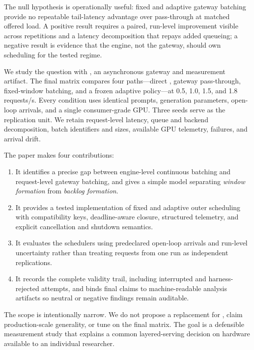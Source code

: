 The null hypothesis is operationally useful: fixed and adaptive gateway
batching provide no repeatable tail-latency advantage over pass-through at
matched offered load. A positive result requires a paired, run-level
improvement visible across repetitions and a latency decomposition that repays
added queueing; a negative result is evidence that the engine, not the gateway,
should own scheduling for the tested regime.

We study the question with \adip{}, an asynchronous gateway and measurement
artifact. The final matrix compares four paths---direct \vllm{}, gateway
pass-through, fixed-window batching, and a frozen adaptive policy---at
0.5, 1.0, 1.5, and 1.8 requests/s. Every condition uses identical prompts,
generation parameters, open-loop arrivals, and a single consumer-grade GPU.
Three seeds serve as the replication unit. We retain request-level latency,
queue and backend decomposition, batch identifiers and sizes, available GPU
telemetry, failures, and arrival drift.

The paper makes four contributions:

\begin{enumerate}[leftmargin=1.4em]
  \item It identifies a precise gap between engine-level continuous batching
        and request-level gateway batching, and gives a simple model separating
        \emph{window formation} from \emph{backlog formation}.
  \item It provides a tested implementation of fixed and adaptive outer
        scheduling with compatibility keys, deadline-aware closure, structured
        telemetry, and explicit cancellation and shutdown semantics.
  \item It evaluates the schedulers using predeclared open-loop arrivals and
        run-level uncertainty rather than treating requests from one run as
        independent replications.
  \item It records the complete validity trail, including interrupted and
        harness-rejected attempts, and binds final claims to machine-readable
        analysis artifacts so neutral or negative findings remain auditable.
\end{enumerate}

The scope is intentionally narrow. We do not propose a replacement for
\vllm{}, claim production-scale generality, or tune on the final matrix. The
goal is a defensible measurement study that explains a common layered-serving
decision on hardware available to an individual researcher.

